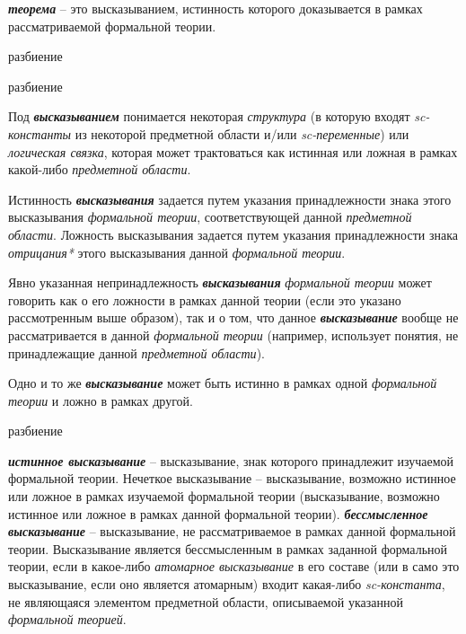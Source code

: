 \textbf{\textit{теорема}} -- это высказыванием, истинность которого доказывается в рамках рассматриваемой формальной теории.

\begin{SCn}
\begin{scnrelfromset}{разбиение}
\end{scnrelfromset}
\begin{scnrelfromset}{разбиение}
\end{scnrelfromset}
\end{SCn}

Под \textbf{\textit{высказыванием}} понимается некоторая \textit{структура} (в которую входят \textit{sc-константы} из некоторой предметной области и/или \textit{sc-переменные}) или \textit{логическая связка}, которая может трактоваться как истинная или ложная в рамках какой-либо \textit{предметной области}.

Истинность \textbf{\textit{высказывания}} задается путем указания принадлежности знака этого высказывания \textit{формальной теории}, соответствующей данной \textit{предметной области}. Ложность высказывания задается путем указания принадлежности знака \textit{отрицания*} этого высказывания данной \textit{формальной теории}.

Явно указанная непринадлежность \textbf{\textit{высказывания}} \textit{формальной теории} может говорить как о его ложности в рамках данной теории (если это указано рассмотренным выше образом), так и о том, что данное  \textbf{\textit{высказывание}} вообще не рассматривается в данной \textit{формальной теории} (например, использует понятия, не принадлежащие данной \textit{предметной области}).

Одно и то же \textbf{\textit{высказывание}} может быть истинно в рамках одной \textit{формальной теории} и ложно в рамках другой.

\begin{SCn}
\begin{scnrelfromset}{разбиение}
\end{scnrelfromset}
\end{SCn}

\textbf{\textit{истинное высказывание}} -- высказывание, знак которого принадлежит изучаемой формальной теории.
Нечеткое высказывание -- высказывание, возможно истинное или ложное в рамках изучаемой формальной теории (высказывание, возможно истинное или ложное в рамках данной формальной теории).
\textbf{\textit{бессмысленное высказывание}} -- высказывание, не рассматриваемое в рамках данной формальной теории. Высказывание является бессмысленным в рамках заданной формальной теории, если в какое-либо \textit{атомарное высказывание} в его составе (или в само это высказывание, если оно является атомарным) входит какая-либо \textit{sc-константа}, не являющаяся элементом предметной области, описываемой указанной \textit{формальной теорией}.

